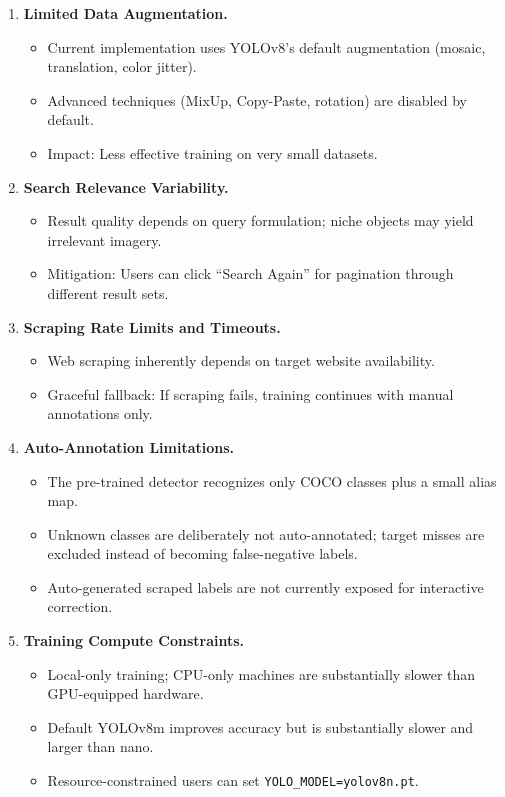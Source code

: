 \documentclass[12pt, letterpaper]{article}
\newcommand{\code}[1]{\texttt{\small\colorbox{codebg}{#1}}}
\begin{document}
\begin{enumerate}
  \item \textbf{Limited Data Augmentation.} 
    \begin{itemize}
      \item Current implementation uses YOLOv8's default augmentation (mosaic, translation, color jitter).
      \item Advanced techniques (MixUp, Copy-Paste, rotation) are disabled by default.
      \item Impact: Less effective training on very small datasets.
    \end{itemize}
  
  \item \textbf{Search Relevance Variability.} 
    \begin{itemize}
      \item Result quality depends on query formulation; niche objects may yield irrelevant imagery.
      \item Mitigation: Users can click ``Search Again'' for pagination through different result sets.
    \end{itemize}
  
  \item \textbf{Scraping Rate Limits and Timeouts.} 
    \begin{itemize}
      \item Web scraping inherently depends on target website availability.
      \item Graceful fallback: If scraping fails, training continues with manual annotations only.
    \end{itemize}
  
  \item \textbf{Auto-Annotation Limitations.} 
    \begin{itemize}
      \item The pre-trained detector recognizes only COCO classes plus a small alias map.
      \item Unknown classes are deliberately not auto-annotated; target misses are excluded
        instead of becoming false-negative labels.
      \item Auto-generated scraped labels are not currently exposed for interactive correction.
    \end{itemize}
  
  \item \textbf{Training Compute Constraints.} 
    \begin{itemize}
      \item Local-only training; CPU-only machines are substantially slower than GPU-equipped hardware.
      \item Default YOLOv8m improves accuracy but is substantially slower and larger than nano.
      \item Resource-constrained users can set \code{YOLO\_MODEL=yolov8n.pt}.
    \end{itemize}
  

\end{enumerate}
\end{document}
